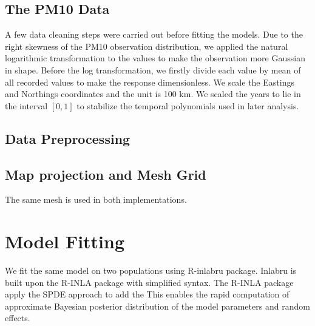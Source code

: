 \subsection{The PM10 Data}
A few data cleaning steps were carried out before fitting the models. Due to the right skewness of 
the PM10 observation distribution, we applied the natural logarithmic transformation to the values
to make the observation more Gaussian in shape. Before the log transformation, we firstly divide
each value by mean of all recorded values to make the response dimensionless.
We scale the Eastings and Northings coordinates and the unit is 100 km. We scaled the years to
lie in the interval $[0, 1]$ to stabilize the temporal polynomials used in later analysis.

\subsection{Data Preprocessing}

\subsection{Map projection and Mesh Grid}
The same mesh is used in both implementations. 

\section{Model Fitting}
We fit the same model on two populations using R-inlabru package. Inlabru is built upon the R-INLA 
package with simplified syntax. The R-INLA package apply the SPDE approach to add the
This enables the rapid computation of approximate Bayesian posterior distribution of the model 
parameters and random effects.
